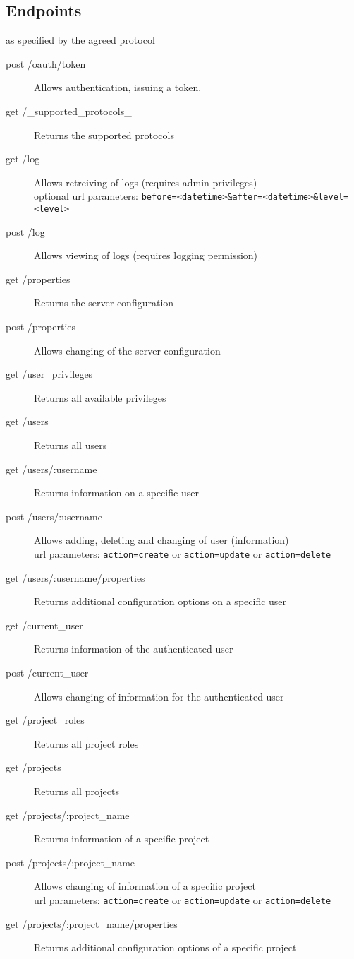 \subsection{Endpoints}
as specified by the agreed protocol
\begin{description}
\item[post	/oauth/token] Allows authentication, issuing a token.
\item[get	/\_supported\_protocols\_] Returns the supported protocols
\item[get	/log] Allows retreiving of logs (requires admin privileges)\\
optional url parameters: \texttt{before=<datetime>\&after=<datetime>\&level=<level>} 
\item[post	/log] Allows viewing of logs (requires logging permission)
\item[get	/properties] Returns the server configuration
\item[post	/properties] Allows changing of the server configuration
\item[get	/user\_privileges] Returns all available privileges
\item[get	/users] Returns all users 
\item[get	/users/:username] Returns information on a specific user
\item[post 	/users/:username] Allows adding, deleting and changing of user (information)\\
url parameters: \texttt{action=create} or \texttt{action=update} or \texttt{action=delete}
\item[get	/users/:username/properties] Returns additional configuration options on a specific user
\item[get	/current\_user] Returns information of the authenticated user
\item[post	/current\_user] Allows changing of information for the authenticated user
\item[get	/project\_roles] Returns all project roles
\item[get	/projects] Returns all projects
\item[get	/projects/:project\_name] Returns information of a specific project
\item[post	/projects/:project\_name] Allows changing of information of a specific project\\
url parameters: \texttt{action=create} or \texttt{action=update} or \texttt{action=delete}
\item[get	/projects/:project\_name/properties] Returns additional configuration options of a specific project

\end{description}
